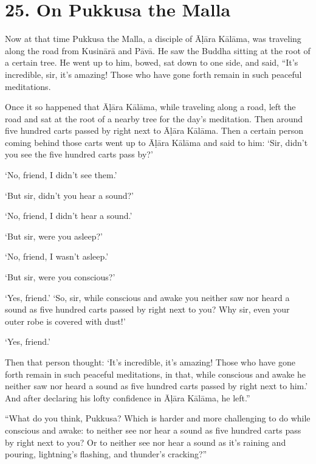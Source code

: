 \documentclass[12pt,openany]{book}%
\begin{document}
\section*{25. On Pukkusa the Malla }

Now at that time Pukkusa the Malla, a disciple of \textsanskrit{Āḷāra} \textsanskrit{Kālāma}, was traveling along the road from \textsanskrit{Kusinārā} and \textsanskrit{Pāvā}. He saw the Buddha sitting at the root of a certain tree. He went up to him, bowed, sat down to one side, and said, “It’s incredible, sir, it’s amazing! Those who have gone forth remain in such peaceful meditations. 

Once it so happened that \textsanskrit{Āḷāra} \textsanskrit{Kālāma}, while traveling along a road, left the road and sat at the root of a nearby tree for the day’s meditation. Then around five hundred carts passed by right next to \textsanskrit{Āḷāra} \textsanskrit{Kālāma}. Then a certain person coming behind those carts went up to \textsanskrit{Āḷāra} \textsanskrit{Kālāma} and said to him: ‘Sir, didn’t you see the five hundred carts pass by?’ 

‘No, friend, I didn’t see them.’ 

‘But sir, didn’t you hear a sound?’ 

‘No, friend, I didn’t hear a sound.’ 

‘But sir, were you asleep?’ 

‘No, friend, I wasn’t asleep.’ 

‘But sir, were you conscious?’ 

‘Yes, friend.’ ‘So, sir, while conscious and awake you neither saw nor heard a sound as five hundred carts passed by right next to you? Why sir, even your outer robe is covered with dust!’ 

‘Yes, friend.’ 

Then that person thought: ‘It’s incredible, it’s amazing! Those who have gone forth remain in such peaceful meditations, in that, while conscious and awake he neither saw nor heard a sound as five hundred carts passed by right next to him.’ And after declaring his lofty confidence in \textsanskrit{Āḷāra} \textsanskrit{Kālāma}, he left.” 

“What do you think, Pukkusa? Which is harder and more challenging to do while conscious and awake: to neither see nor hear a sound as five hundred carts pass by right next to you? Or to neither see nor hear a sound as it’s raining and pouring, lightning’s flashing, and thunder’s cracking?” 
\end{document}

